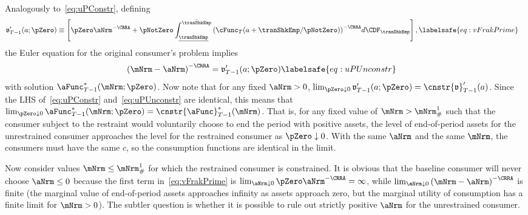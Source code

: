 \documentclass[\econtexRoot/BufferStockTheory]{subfiles}
\begin{document}
Analogously to~\eqref{eq:uPConstr}, defining
\begin{equation}\begin{gathered}\begin{aligned}
      \mathfrak{v}_{T-1}^{\prime}(a;\pZero)  & \equiv  \left[\pZero \aNrm^{-\CRRA}+\pNotZero\int_{\underline{\tranShkEmp}}^{\bar{\tranShkEmp}} {\left(\cFunc_{T}(a+\tranShkEmp/\pNotZero)\right)}^{-\CRRA} d\CDF_{\tranShkEmp}\right], \labelsafe{eq:vFrakPrime}
    \end{aligned}\end{gathered}\end{equation}
the Euler equation for the original consumer's problem implies
\begin{equation}\begin{gathered}\begin{aligned}
      {(\mNrm-\aNrm)}^{-\CRRA}  & = \mathfrak{v}_{T-1}^{\prime}(a;\pZero) \labelsafe{eq:uPUnconstr}
    \end{aligned}\end{gathered}\end{equation}
with solution $\aFunc_{T-1}^{*}(\mNrm;\pZero)$.
Now note that for any fixed $\aNrm>0$, $\lim_{\pZero \downarrow 0} \mathfrak{v}_{T-1}^{\prime}(a;\pZero) = \cnstr{\mathfrak{v}}_{T-1}^{\prime}(a)$.
Since the LHS of~\eqref{eq:uPConstr} and~\eqref{eq:uPUnconstr} are identical, this means that $\lim_{\pZero \downarrow 0} \aFunc_{T-1}^{*}(\mNrm;\pZero) = \cnstr{\aFunc}_{T-1}^{*}(\mNrm)$.
That is, for any fixed value of $\mNrm > \mNrm^{1}_{\#}$ such that the consumer subject to the restraint would voluntarily choose to end the period with positive assets, the level of end-of-period assets for the unrestrained consumer approaches the level for the restrained consumer as $\pZero \downarrow 0$.
With the same $\aNrm$ and the same $\mNrm$, the consumers must have the same $c$, so the consumption functions are identical in the limit.

Now consider values $\mNrm\leq \mNrm^{1}_{\#}$ for which the restrained consumer is constrained.
It is obvious that the baseline consumer will never choose $\aNrm \leq 0$ because the first term in~\eqref{eq:vFrakPrime} is $\lim_{\aNrm \downarrow 0} \pZero \aNrm^{-\CRRA} = \infty$, while $\lim_{\aNrm \downarrow 0} {(\mNrm-\aNrm)}^{-\CRRA}$ is finite (the marginal value of end-of-period assets approaches infinity as assets approach zero, but the marginal utility of consumption has a finite limit for $\mNrm>0$).
The subtler question is whether it is possible to rule out strictly positive $\aNrm$ for the unrestrained consumer.
\end{document}
